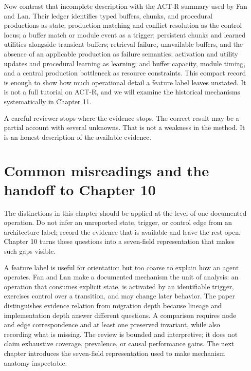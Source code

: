 Now contrast that incomplete description with the ACT-R summary used by Fan and Lan. Their ledger identifies typed buffers, chunks, and procedural productions as state; production matching and conflict resolution as the control locus; a buffer match or module event as a trigger; persistent chunks and learned utilities alongside transient buffers; retrieval failure, unavailable buffers, and the absence of an applicable production as failure semantics; activation and utility updates and procedural learning as learning; and buffer capacity, module timing, and a central production bottleneck as resource constraints. This compact record is enough to show how much operational detail a feature label leaves unstated. It is not a full tutorial on ACT-R, and we will examine the historical mechanisms systematically in Chapter 11.

A careful reviewer stops where the evidence stops. The correct result may be a partial account with several unknowns. That is not a weakness in the method. It is an honest description of the available evidence.

\section{Common misreadings and the handoff to Chapter 10}
\label{sec:chapter9-common-misreadings}

The distinctions in this chapter should be applied at the level of one documented operation. Do not infer an unreported state, trigger, or control edge from an architecture label; record the evidence that is available and leave the rest open. Chapter 10 turns these questions into a seven-field representation that makes such gaps visible.

\begin{chapterrecap}
A feature label is useful for orientation but too coarse to explain how an agent operates. Fan and Lan make a documented mechanism the unit of analysis: an operation that consumes explicit state, is activated by an identifiable trigger, exercises control over a transition, and may change later behavior. The paper distinguishes evidence relation from migration depth because lineage and implementation depth answer different questions. A comparison requires node and edge correspondence and at least one preserved invariant, while also recording what is missing. The review is bounded and interpretive; it does not claim exhaustive coverage, prevalence, or causal performance gains. The next chapter introduces the seven-field representation used to make mechanism anatomy inspectable.
\end{chapterrecap}


